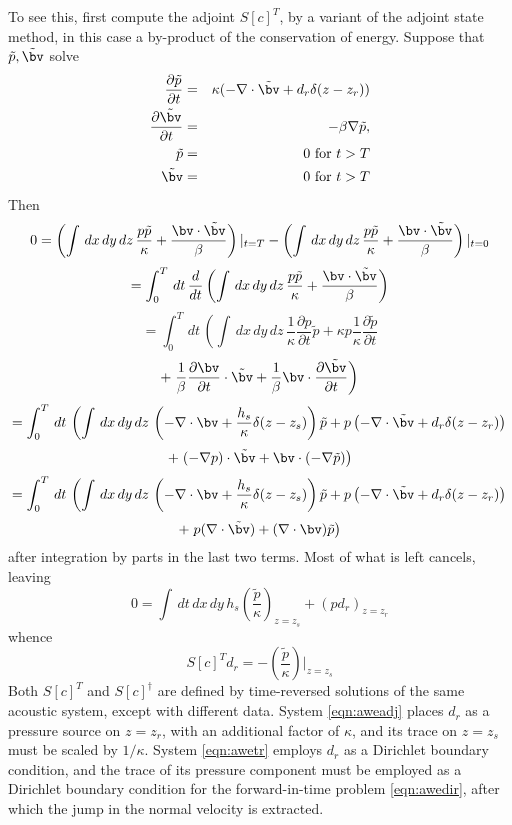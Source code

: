 To see this, first compute the adjoint $S[c]^T$, by a variant of the adjoint state method, in this case a by-product of the conservation of energy. Suppose that 
$\tilde{p},\tilde{\bv}$ solve
\begin{eqnarray}
\label{eqn:aweadj}
\frac{\partial \tilde{p}}{\partial t} & = & \kappa (-\nabla \cdot \tilde{\bv} + 
 d_r \delta(z-z_r))\nonumber \\
\frac{\partial \tilde{\bv}}{\partial t} & = & - \beta \nabla \tilde{p},\nonumber \\
\tilde{p} & =& 0 \mbox{ for } t>T\nonumber\\ 
\tilde{\bv} & = & 0 \mbox{ for } t>T 
\end{eqnarray} 
Then
\[
0 = 
\left(\int\, dx\,dy\,dz\, \frac{p \tilde{p}}{\kappa} +  
\frac{\bv \cdot \tilde{\bv}}{\beta} \right)|_{t=T}
-
\left(\int\, dx\,dy\,dz\, \frac{p \tilde{p}}{\kappa} +  \frac{\bv \cdot \tilde{\bv}}{\beta} \right)|_{t=0}
\]
\[
= 
\int_{0}^{T} \,dt\, \frac{d}{dt}\left(\int\, dx\,dy\,dz\, \frac{p \tilde{p}}{\kappa} +  \frac{\bv \cdot \tilde{\bv}}{\beta} \right)
\]
\[
= 
\int_{0}^{T} \,dt\, \left(\int\, dx\,dy\,dz\, \frac{1}{\kappa} \frac{\partial p}{\partial t} \tilde {p} + \kappa p \frac{1}{\kappa}\frac{\partial \tilde{p}}{\partial t} \right.
\]
\[
+
\left. \frac{1}{\beta} \frac{\partial \bv}{\partial t} \cdot \tilde{\bv} + \frac{1}{\beta} \bv \cdot \frac{\partial \tilde{\bv}}{\partial t} \right)
\]
\[
= 
\int_{0}^{T} \,dt\, \left(\int\, dx\,dy\,dz\, \left(- \nabla \cdot \bv + 
 \frac{h_s}{\kappa} \delta(z-z_s)\right) \tilde{p} + p \left(- \nabla \cdot \tilde{\bv} + 
 d_r \delta(z-z_r)\right) \right.
\]
\[
+
\left.  (- \nabla p) \cdot \tilde{\bv} + \bv \cdot (-\nabla \tilde{p}) \right)
\]
\[
= 
\int_{0}^{T}\,dt\, \left(\int\, dx\,dy\,dz\, \left(- \nabla \cdot \bv + 
 \frac{h_s}{\kappa} \delta(z-z_s)\right) \tilde{p} + p \left(- \nabla \cdot \tilde{\bv} + 
 d_r \delta(z-z_r)\right) \right.
\]
\[
+
\left.  p (\nabla \cdot \tilde{\bv}) + (\nabla \cdot \bv) \tilde{p} \right)
\]
after integration by parts in the last two terms. Most of what is left cancels, leaving 
\[
0 = \int\,dt\,dx\,dy\, h_s \left(\frac{\tilde{p}}{\kappa}\right)_{z=z_s} + (p  d_r)_{z=z_r}
\]
whence
\begin{equation}
\label{eqn:sadj}
 S[c]^T d_r = -\left(\frac{\tilde{p}}{\kappa}\right)|_{z=z_s}
\end{equation}
Both $S[c]^T$ and $S[c]^{\dagger}$ are defined by time-reversed solutions of the same acoustic system, except with different data. System \ref{eqn:aweadj} places $d_r$ as a pressure source on $z=z_r$, with an additional factor of $\kappa$, and its trace on $z=z_s$ must be scaled by $1/\kappa$. System \ref{eqn:awetr} employs $d_r$ as a Dirichlet boundary condition, and the trace of its pressure component must be employed as a Dirichlet boundary condition for the forward-in-time problem \ref{eqn:awedir}, after which the jump in the normal velocity is extracted. 

